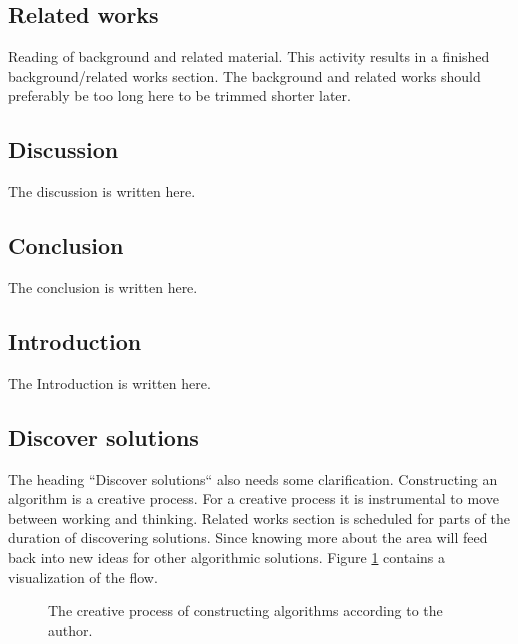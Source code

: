 \documentclass[msc,lith,english]{liuthesis}
\begin{document}
\subsection{Related works}
Reading of background and related material. This activity results in a finished background/related works section.
The background and related works should preferably be too long here to be trimmed shorter later.

\subsection{Discussion}
The discussion is written here.

\subsection{Conclusion}
The conclusion is written here.

\subsection{Introduction}
The Introduction is written here.

\subsection{Discover solutions}
The heading ``Discover solutions`` also needs some clarification. Constructing
an algorithm is a creative process. For a creative process it is instrumental
to move between working and thinking. Related works section is scheduled for
parts of the duration of discovering solutions. Since knowing more about the
area will feed back into new ideas for other algorithmic solutions. 
Figure \ref{figCreativeProcess} contains a visualization of the flow.

\begin{center}
\begin{figure}[h]
\centering
{}
\caption{The creative process of constructing algorithms according to the author.}
\label{figCreativeProcess}
\end{figure}
\end{center}
\end{document}

